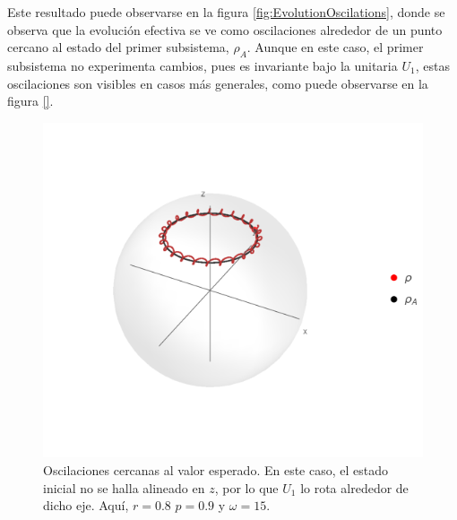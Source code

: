 Este resultado puede observarse en la figura \ref{fig:EvolutionOscilations}, donde se observa que la evolución efectiva se ve como oscilaciones alrededor de un punto cercano al estado del primer subsistema, $\rho_{A}$. Aunque en este caso, el primer subsistema no experimenta cambios, pues es invariante bajo la unitaria $U_{1}$, estas oscilaciones son visibles en casos más generales, como puede observarse en la figura \ref{}.

\begin{figure}[h!]
    \centering
    \includegraphics[width=0.6\linewidth]{chapter3/figures_separable/U1xU2_H1=(sz)_H2=15(sx-sy)_z=0.8_p=0.9_wXY=0.5.png}
    \caption{Oscilaciones cercanas al valor esperado. En este caso, el estado inicial no se halla alineado en $z$, por lo que $U_{1}$ lo rota alrededor de dicho eje. Aquí, $r=0.8$ $p=0.9$ y $\omega=15$. }
    \label{fig:GeneralOscilations1}
\end{figure}

